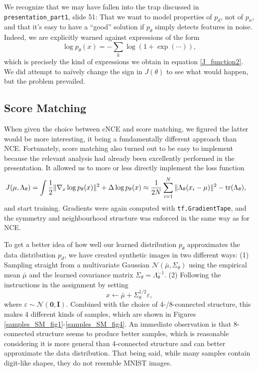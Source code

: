 \documentclass[a4paper]{article}
\theoremstyle{definition}
\theoremstyle{plain}
\begin{document}
We recognize that we may have fallen into the trap discussed in \texttt{presentation\_part1}, slide 51: That we want to model properties of $p_d$, not of $p_n$, and that it's easy to have a ``good'' solution if $p_\theta$ simply detects features in noise. Indeed, we are explicitly warned against expressions of the form
$$\log p_\theta(x) = -\sum_k \log(1 + \exp(\cdots)),$$
which is precisely the kind of expressions we obtain in equation \eqref{J_function2}. We did attempt to naïvely change the sign in $J(\theta)$ to see what would happen, but the problem prevailed.


\subsection*{Score Matching}

When given the choice between cNCE and score matching, we figured the latter would be more interesting, it being a fundamentally different approach than NCE. Fortunately, score matching also turned out to be easy to implement because the relevant analysis had already been excellently performed in the presentation. It allowed us to more or less directly implement the loss function
\begin{alignat*}{1}
J(\mu,\Lambda_\theta) &= \int \frac{1}{2} \|\nabla_x \log p_\theta(x)\|^2 + \Delta \log p_\theta(x) \approx \frac{1}{2N} \sum_{i=1}^N \| \Lambda_\theta (x_i - \mu)\|^2 - \tr(\Lambda_\theta),
\end{alignat*}
and start training. Gradients were again computed with \texttt{tf.GradientTape}, and the symmetry and neighbourhood structure was enforced in the same way as for NCE.

To get a better idea of how well our learned distribution $p_\theta$ approximates the data distribution $p_d$, we have created synthetic images in two different ways: (1) Sampling straight from a multivariate Gaussian $\mathcal{N}(\bar\mu,\Sigma_\theta)$ using the empirical mean $\bar\mu$ and the learned covariance matrix $\Sigma_\theta = \Lambda_\theta^{-1}$. (2) Following the instructions in the assignment by setting
$$x \leftarrow \bar\mu + \Sigma_\theta^{1/2}\varepsilon,$$
where $\varepsilon \sim \mathcal{N}(\mathbf{0},\mathbf{I})$. Combined with the choice of 4-/8-connected structure, this makes 4 different kinds of samples, which are shown in Figures \ref{samples_SM_fig1}-\ref{samples_SM_fig4}. An immediate observation is that 8-connected structure seems to produce better samples, which is reasonable considering it is more general than 4-connected structure and can better approximate the data distribution. That being said, while many samples contain digit-like shapes, they do not resemble  MNIST images.
\end{document}
